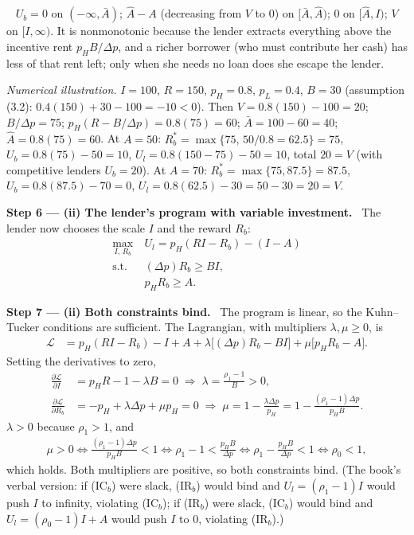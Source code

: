 \documentclass[11pt,a4paper]{article}
\newcommand{\step}[2]{\par\medskip\noindent\textbf{Step #1 --- #2.}~}
\newcommand{\answer}[1]{\par\smallskip\noindent\fbox{\textbf{Answer #1.}}~}
\begin{document}
\answer{(i-c)} $U_b=0$ on $(-\infty,\bar A)$; $\hat A-A$ (decreasing from $V$ to $0$) on
$[\bar A,\hat A)$; $0$ on $[\hat A,I)$; $V$ on $[I,\infty)$. It is nonmonotonic because the
lender extracts everything above the incentive rent $p_HB/\Delta p$, and a richer borrower
(who must contribute her cash) has less of that rent left; only when she needs no loan does she
escape the lender.

\emph{Numerical illustration.} $I=100$, $R=150$, $p_H=0.8$, $p_L=0.4$, $B=30$ (assumption (3.2):
$0.4(150)+30-100=-10<0$). Then $V=0.8(150)-100=20$; $B/\Delta p=75$; $p_H(R-B/\Delta p)=0.8(75)=60$;
$\bar A=100-60=40$; $\hat A=0.8(75)=60$. At $A=50$: $R_b^*=\max\{75,\,50/0.8=62.5\}=75$,
$U_b=0.8(75)-50=10$, $U_l=0.8(150-75)-50=10$, total $20=V$ (with competitive lenders $U_b=20$).
At $A=70$: $R_b^*=\max\{75,87.5\}=87.5$, $U_b=0.8(87.5)-70=0$, $U_l=0.8(62.5)-30=50-30=20=V$.

\step{6}{(ii) The lender's program with variable investment} The lender now chooses the scale
$I$ and the reward $R_b$:
\begin{align}
  \max_{I,\,R_b}\ & U_l=p_H(RI-R_b)-(I-A) \nonumber\\
  \text{s.t. }\ & (\Delta p)R_b\ge BI, \tag{IC$_b$}\\
                & p_HR_b\ge A. \tag{IR$_b$}
\end{align}

\step{7}{(ii) Both constraints bind} The program is linear, so the Kuhn--Tucker conditions are
sufficient. The Lagrangian, with multipliers $\lambda,\mu\ge 0$, is
\begin{align}
  \mathcal L &= p_H(RI-R_b)-I+A+\lambda\big[(\Delta p)R_b-BI\big]+\mu\big[p_HR_b-A\big]. \nonumber
\end{align}
Setting the derivatives to zero,
\begin{align}
  \frac{\partial\mathcal L}{\partial I} &= p_HR-1-\lambda B=0
     \;\Rightarrow\; \lambda=\frac{\rho_1-1}{B}>0, \nonumber\\
  \frac{\partial\mathcal L}{\partial R_b} &= -p_H+\lambda\Delta p+\mu p_H=0
     \;\Rightarrow\; \mu=1-\frac{\lambda\Delta p}{p_H}=1-\frac{(\rho_1-1)\Delta p}{p_HB}. \nonumber
\end{align}
$\lambda>0$ because $\rho_1>1$, and
\begin{align}
  \mu>0 \iff \frac{(\rho_1-1)\Delta p}{p_HB}<1 \iff \rho_1-1<\frac{p_HB}{\Delta p}
        \iff \rho_1-\frac{p_HB}{\Delta p}<1 \iff \rho_0<1, \nonumber
\end{align}
which holds. Both multipliers are positive, so both constraints bind. (The book's verbal version:
if (IC$_b$) were slack, (IR$_b$) would bind and $U_l=(\rho_1-1)I$ would push $I$ to infinity,
violating (IC$_b$); if (IR$_b$) were slack, (IC$_b$) would bind and $U_l=(\rho_0-1)I+A$ would
push $I$ to $0$, violating (IR$_b$).)
\end{document}
